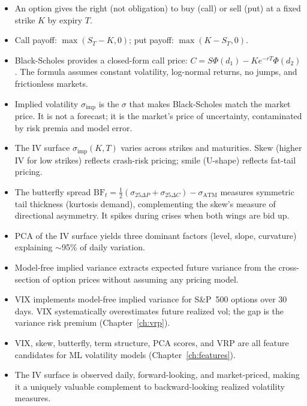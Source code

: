 \begin{itemize}[nosep]
  \item An option gives the right (not obligation) to buy (call) or sell (put) at a fixed strike $K$ by expiry $T$.
  \item Call payoff: $\max(S_T - K, 0)$; put payoff: $\max(K - S_T, 0)$.
  \item Black-Scholes \citep{Black1973} provides a closed-form call price: $C = S\Phi(d_1) - Ke^{-rT}\Phi(d_2)$.
  The formula assumes constant volatility, log-normal returns, no jumps, and frictionless markets.
  \item Implied volatility $\sigma_{\text{imp}}$ is the $\sigma$ that makes Black-Scholes match the market price.
  It is not a forecast; it is the market's price of uncertainty, contaminated by risk premia and model error.
  \item The IV surface $\sigma_{\text{imp}}(K, T)$ varies across strikes and maturities.
  Skew (higher IV for low strikes) reflects crash-risk pricing; smile (U-shape) reflects fat-tail pricing.
  \item The butterfly spread $\mathrm{BF}_t = \frac{1}{2}(\sigma_{25\Delta P} + \sigma_{25\Delta C}) - \sigma_{\mathrm{ATM}}$ measures symmetric tail thickness (kurtosis demand), complementing the skew's measure of directional asymmetry. It spikes during crises when both wings are bid up.
  \item PCA of the IV surface \citep{Cont2002} yields three dominant factors (level, slope, curvature) explaining $\sim$95\% of daily variation.
  \item Model-free implied variance \citep{BrittenJones2000} extracts expected future variance from the cross-section of option prices without assuming any pricing model.
  \item VIX implements model-free implied variance for S\&P~500 options over 30 days.
  VIX systematically overestimates future realized vol; the gap is the variance risk premium (Chapter~\ref{ch:vrp}).
  \item VIX, skew, butterfly, term structure, PCA scores, and VRP are all feature candidates for ML volatility models (Chapter~\ref{ch:features}).
  \item The IV surface is observed daily, forward-looking, and market-priced, making it a uniquely valuable complement to backward-looking realized volatility measures.
\end{itemize}

\vspace{1em}

